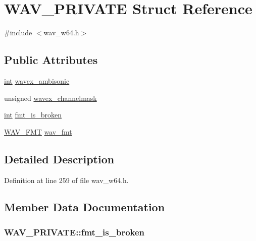 \hypertarget{struct_w_a_v___p_r_i_v_a_t_e}{}\section{W\+A\+V\+\_\+\+P\+R\+I\+V\+A\+TE Struct Reference}
\label{struct_w_a_v___p_r_i_v_a_t_e}


{\ttfamily \#include $<$wav\+\_\+w64.\+h$>$}

\subsection*{Public Attributes}
\begin{DoxyCompactItemize}
\item 
\hyperlink{xmltok_8h_a5a0d4a5641ce434f1d23533f2b2e6653}{int} \hyperlink{struct_w_a_v___p_r_i_v_a_t_e_a1a0f98e264dd0ad6c031a784ea491f97}{wavex\+\_\+ambisonic}
\item 
unsigned \hyperlink{struct_w_a_v___p_r_i_v_a_t_e_a203dea4b2d6a828454e71bdf45e2e19f}{wavex\+\_\+channelmask}
\item 
\hyperlink{xmltok_8h_a5a0d4a5641ce434f1d23533f2b2e6653}{int} \hyperlink{struct_w_a_v___p_r_i_v_a_t_e_a3f87951758feb8f0a30a0d8387b5fa77}{fmt\+\_\+is\+\_\+broken}
\item 
\hyperlink{union_w_a_v___f_m_t}{W\+A\+V\+\_\+\+F\+MT} \hyperlink{struct_w_a_v___p_r_i_v_a_t_e_a05bf751d5063777d3e2f437ae8d90fab}{wav\+\_\+fmt}
\end{DoxyCompactItemize}


\subsection{Detailed Description}


Definition at line 259 of file wav\+\_\+w64.\+h.



\subsection{Member Data Documentation}
\subsubsection[{\texorpdfstring{fmt\+\_\+is\+\_\+broken}{fmt_is_broken}}]{ W\+A\+V\+\_\+\+P\+R\+I\+V\+A\+T\+E\+::fmt\+\_\+is\+\_\+broken}\hypertarget{struct_w_a_v___p_r_i_v_a_t_e_a3f87951758feb8f0a30a0d8387b5fa77}{}\label{struct_w_a_v___p_r_i_v_a_t_e_a3f87951758feb8f0a30a0d8387b5fa77}


